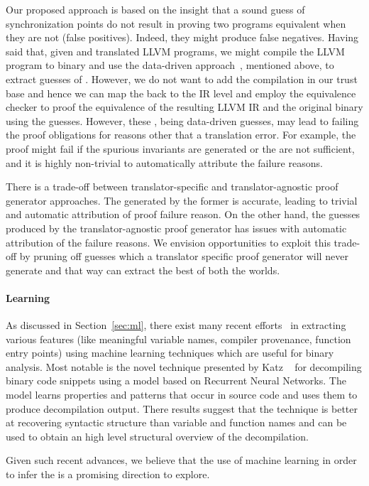 Our proposed approach is based on the insight that a sound guess of synchronization
points do not result in proving two programs equivalent when they are not
(false positives). Indeed, they might produce false negatives. Having said
that, given  \ISA and translated LLVM programs, we might compile the LLVM
program to binary and use the data-driven approach~\cite{DDEC:OOPSLA:2013}, mentioned above, to extract guesses of
\syncps. However, we do not want to add the compilation in our
trust base and hence we can map the \syncps back to the IR level
and employ the equivalence checker  to proof the equivalence of the resulting
LLVM IR and the original binary using the \syncp guesses. However, these \syncp, being data-driven guesses, may lead to failing the proof obligations for reasons other that a translation error. For example, the proof might fail if the spurious invariants are generated or the \syncps are not sufficient, and it is highly non-trivial to automatically attribute the failure reasons. 

There is a trade-off between translator-specific and translator-agnostic proof generator approaches. The \syncps generated by the former is accurate, leading to trivial and automatic attribution of proof failure reason. On the other hand, the \syncp guesses produced by the  translator-agnostic proof generator has issues with automatic attribution  of the failure reasons. We envision opportunities to exploit this trade-off by pruning off \syncp  guesses which a translator specific proof generator will never generate and that way can extract the best of both the worlds. 

\paragraph{\textbf{Learning \syncps}}

As discussed in Section~\ref{sec:ml}, there exist many recent efforts~\cite{Jaffe:2018ICPC,Rosenblum2007,Rosenblum:2008,Rosenblum:2010,Rosenblum:2011,Bao:2014,Shin:2015} in extracting various features (like meaningful variable names, compiler provenance, function entry points) using machine learning techniques which are useful for binary analysis. Most notable is the novel technique presented by Katz \etal~\cite{katz2018rnn}  for decompiling binary code snippets using a model based on Recurrent Neural Networks. The model learns properties and patterns that occur in source code and uses them to produce decompilation output. There results suggest that the technique is better at recovering syntactic structure than variable and function names and can be used to obtain an high level structural  overview of the decompilation.
    
Given such recent advances, we believe that the use of machine learning in order to infer the \syncp is a promising direction to explore.
